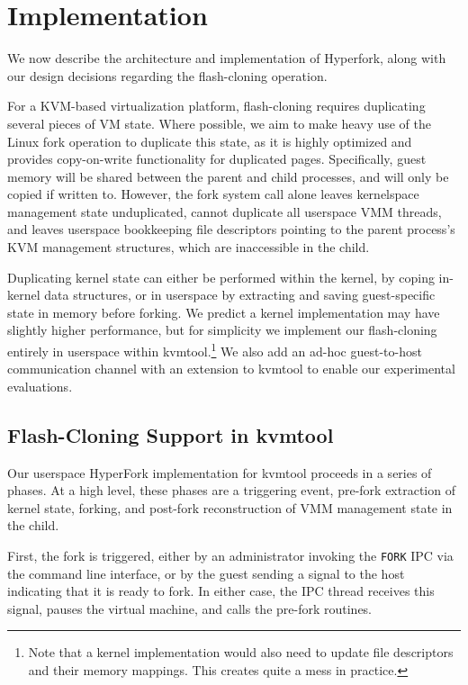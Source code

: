 
\section{Implementation} \label{sec:implementation}

We now describe the architecture and implementation of Hyperfork, along with
our design decisions regarding the flash-cloning operation.

For a KVM-based virtualization platform, flash-cloning requires duplicating
several pieces of VM state. Where possible, we aim to make heavy use of the
Linux fork operation to duplicate this state, as it is highly optimized and
provides copy-on-write functionality for duplicated pages. Specifically, guest
memory will be shared between the parent and child processes, and will only be
copied if written to. However, the fork system call alone leaves kernelspace
management state unduplicated, cannot duplicate all userspace VMM threads, and
leaves userspace bookkeeping file descriptors pointing to the parent process's
KVM management structures, which are inaccessible in the child.

Duplicating kernel state can either be performed within the kernel, by
coping in-kernel data structures, or in userspace by extracting and saving
guest-specific state in memory before forking. We predict a kernel
implementation may have slightly higher performance, but for simplicity we
implement our flash-cloning entirely in userspace within kvmtool.\footnote{Note
that a kernel implementation would also need to update file descriptors and
their memory mappings. This creates quite a mess in practice.} We also add an
ad-hoc guest-to-host communication channel with an extension to kvmtool to
enable our experimental evaluations.

\subsection{Flash-Cloning Support in kvmtool}

Our userspace HyperFork implementation for kvmtool proceeds in a series of
phases. At a high level, these phases are a triggering event, pre-fork
extraction of kernel state, forking, and post-fork reconstruction of VMM
management state in the child.

First, the fork is triggered, either by an administrator invoking the
\texttt{FORK} IPC via the command line interface, or by the guest sending a
signal to the host indicating that it is ready to fork. In either case, the IPC
thread receives this signal, pauses the virtual machine, and calls the pre-fork
routines.

